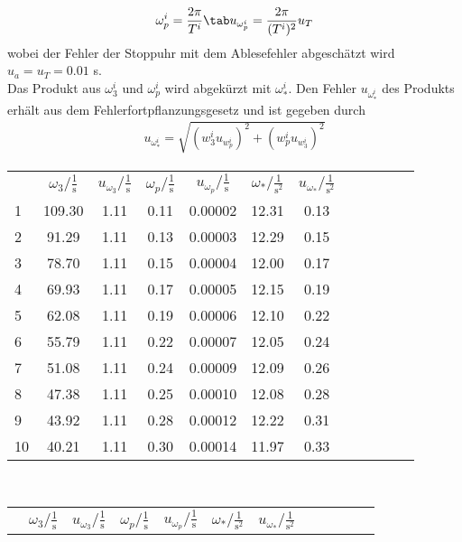 \begin{gather}
    \omega_p^i=\frac{2\pi}{T^i}\tab u_{\omega_p^i}=\frac{2\pi}{(T^i)^2}u_T
\end{gather}
wobei der Fehler der Stoppuhr mit dem Ablesefehler abgeschätzt wird $u_a=u_T=0.01$ s.\\
Das Produkt aus $\omega_3^i$ und $\omega_p^i$ wird abgekürzt mit $\omega_*^i$. Den Fehler $u_{\omega_*^i}$ des Produkts erhält aus dem Fehlerfortpflanzungsgesetz und ist gegeben durch
\begin{align}
    u_{\omega_\ast^i}=\sqrt{(w_3^i u_{w_p^i})^2+(w_p^i u_{w_3^i})^2}
\end{align}
\begin{center}
    \begin{tabular}{gccccccccccc}
         &      $\omega_3/\frac{1}{\text{s}}$ &  $u_{\omega_3}/\frac{1}{\text{s}}$ &    $\omega_p/\frac{1}{\text{s}}$ &     $u_{\omega_p}/\frac{1}{\text{s}}$ &     $\omega_*/\frac{1}{\text{s}^2}$&  $u_{\omega_*}/\frac{1}{\text{s}^2}$\\
        1  &  109.30 &  1.11 &  0.11 &  0.00002 &  12.31 &  0.13 \\
        2  &   91.29 &  1.11 &  0.13 &  0.00003 &  12.29 &  0.15 \\
        3  &   78.70 &  1.11 &  0.15 &  0.00004 &  12.00 &  0.17 \\
        4  &   69.93 &  1.11 &  0.17 &  0.00005 &  12.15 &  0.19 \\
        5  &   62.08 &  1.11 &  0.19 &  0.00006 &  12.10 &  0.22 \\
        6  &   55.79 &  1.11 &  0.22 &  0.00007 &  12.05 &  0.24 \\
        7  &   51.08 &  1.11 &  0.24 &  0.00009 &  12.09 &  0.26 \\
        8  &   47.38 &  1.11 &  0.25 &  0.00010 &  12.08 &  0.28 \\
        9  &   43.92 &  1.11 &  0.28 &  0.00012 &  12.22 &  0.31 \\
        10 &   40.21 &  1.11 &  0.30 &  0.00014 &  11.97 &  0.33 \\
    \end{tabular}\\
    \begin{tabular}{gccccccccccc}
         &      $\omega_3/\frac{1}{\text{s}}$ &  $u_{\omega_3}/\frac{1}{\text{s}}$ &    $\omega_p/\frac{1}{\text{s}}$ &     $u_{\omega_p}/\frac{1}{\text{s}}$ &     $\omega_*/\frac{1}{\text{s}^2}$&  $u_{\omega_*}/\frac{1}{\text{s}^2}$\\

\end{tabular}
\end{center}
